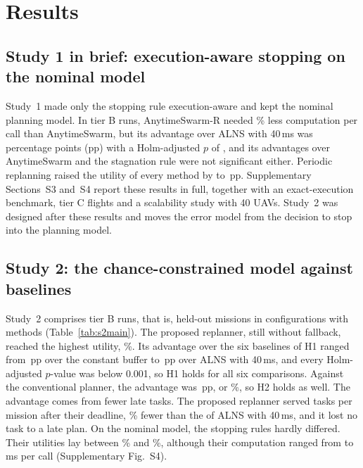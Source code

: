 \section{Results}\label{sec:results}
\subsection{Study 1 in brief: execution-aware stopping on the nominal model}\label{sec:study1}
Study~1 made only the stopping rule execution-aware and kept the nominal planning model. In  tier B
runs, AnytimeSwarm-R needed \% less computation per call than AnytimeSwarm, but its advantage over ALNS
with 40\,ms was \,percentage points (pp) with a Holm-adjusted $p$ of , and its
advantages over AnytimeSwarm and the stagnation rule were not significant either. Periodic replanning raised the
utility of every method by  to \,pp. Supplementary Sections~S3 and~S4 report these results
in full, together with an exact-execution benchmark, tier C flights and a scalability study with 40 UAVs. Study~2 was
designed after these results and moves the error model from the decision to stop into the planning model.

\subsection{Study 2: the chance-constrained model against baselines}\label{sec:study2}
Study~2 comprises  tier B runs, that is,  held-out missions in 
configurations with  methods (Table~\ref{tab:s2main}). The proposed replanner, still without fallback,
reached the highest utility, \%. Its advantage over the six baselines of H1 ranged from \,pp
over the constant buffer to \,pp over ALNS with 40\,ms, and every Holm-adjusted $p$-value was below
0.001, so H1 holds for all six comparisons. Against the conventional planner, the advantage was \,pp, or
\%, so H2 holds as well. The advantage comes from fewer late tasks. The proposed replanner served
 tasks per mission after their deadline, \% fewer than the  of ALNS
with 40\,ms, and it lost no task to a late plan. On the nominal model, the stopping rules hardly differed. Their
utilities lay between \% and \%, although their computation ranged from  to
\,ms per call (Supplementary Fig.~S4).

